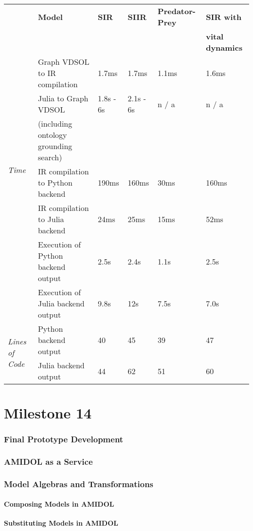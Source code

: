 \documentclass[12pt]{galois-whitepaper}
\begin{document}
{ \footnotesize
\begin{tabular}{|llllll|}
 \hline
  & \textbf{Model}	& \textbf{SIR}	& \textbf{SIIR}	& \textbf{Predator-Prey}	&
                                                  \textbf{SIR with}\\
  & & & & & \textbf{vital dynamics}\\
  \hline
   \multirow{6}{*}{\textit{Time}}     & Graph VDSOL to IR compilation	& 1.7ms	& 1.7ms	& 1.1ms	&
                                                                  1.6ms\\
  & Julia to Graph VDSOL
                & 1.8s - 6s	&2.1s - 6s	& n / a	& n / a\\
  & (including ontology grounding search) & & & &\\
        & IR compilation to Python backend	& 190ms	& 160ms & 30ms
                                                                  &
                                                                    160ms\\
        & IR compilation to Julia backend & 24ms	& 25ms	& 15ms
                                                & 52ms\\
        & Execution of Python backend output	& 2.5s	& 2.4s	& 1.1s
                                                & 2.5s\\
	& Execution of Julia backend output	& 9.8s	& 12s	& 7.5s
                                                & 7.0s\\
  \hline
  \hline
  \multirow{2}{*}{\textit{Lines of Code}} & Python backend output & 40
                                        & 45 & 39	& 47\\
        & Julia backend output	& 44	& 62	& 51	& 60\\
  \hline
\end{tabular}
}

\part{Milestone 14}

\section{Final Prototype Development}

\section{AMIDOL as a Service}

\section{Model Algebras and Transformations}

\subsection{Composing Models in AMIDOL}

\subsection{Substituting Models in AMIDOL}
\end{document}
